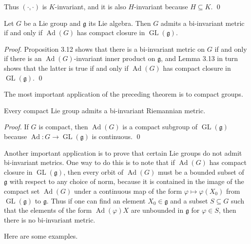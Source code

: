 \begin{lemma}
Thus $(\cdot, \cdot)$ is $K$-invariant, and it is also $H$-invariant because $H \subseteq K$. \qed
\end{lemma}

\begin{theorem}
\label{thm:existence-bi-invariant-metrics}
Let $G$ be a Lie group and $\mathfrak{g}$ its Lie algebra. Then $G$ admits a bi-invariant metric if and only if $\operatorname{Ad}(G)$ has compact closure in $\operatorname{GL}(\mathfrak{g})$.
\end{theorem}

\noindent
\textit{Proof.} Proposition 3.12 shows that there is a bi-invariant metric on $G$ if and only if there is an $\operatorname{Ad}(G)$-invariant inner product on $\mathfrak{g}$, and Lemma 3.13 in turn shows that the latter is true if and only if $\operatorname{Ad}(G)$ has compact closure in $\operatorname{GL}(\mathfrak{g})$. \qed

The most important application of the preceding theorem is to compact groups.

\begin{corollary}
\label{cor:compact-lie-group-bi-invariant-metric}
Every compact Lie group admits a bi-invariant Riemannian metric.
\end{corollary}

\noindent
\textit{Proof.} If $G$ is compact, then $\operatorname{Ad}(G)$ is a compact subgroup of $\operatorname{GL}(\mathfrak{g})$ because $\operatorname{Ad}: G \to \operatorname{GL}(\mathfrak{g})$ is continuous. \qed

Another important application is to prove that certain Lie groups do not admit bi-invariant metrics. One way to do this is to note that if $\operatorname{Ad}(G)$ has compact closure in $\operatorname{GL}(\mathfrak{g})$, then every orbit of $\operatorname{Ad}(G)$ must be a bounded subset of $\mathfrak{g}$ with respect to any choice of norm, because it is contained in the image of the compact set $\operatorname{Ad}(G)$ under a continuous map of the form $\varphi \mapsto \varphi(X_0)$ from $\operatorname{GL}(\mathfrak{g})$ to $\mathfrak{g}$. Thus if one can find an element $X_0 \in \mathfrak{g}$ and a subset $S \subseteq G$ such that the elements of the form $\operatorname{Ad}(\varphi)X$ are unbounded in $\mathfrak{g}$ for $\varphi \in S$, then there is no bi-invariant metric.

Here are some examples.

